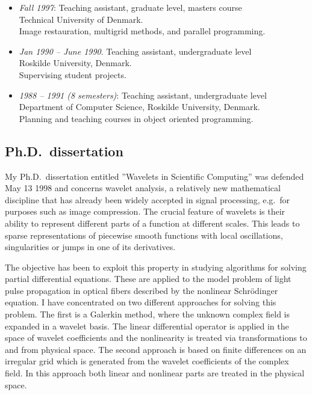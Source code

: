 \documentclass[12pt,a4paper]{article}
\begin{document}
\begin{itemize}
\item {\em Fall 1997}: Teaching assistant, graduate level, masters course\\ 
      Technical University of Denmark. \\
      Image restauration, multigrid methods, and parallel programming.

\item {\em Jan 1990 -- June 1990}. Teaching assistant, undergraduate level \\
      Roskilde University, Denmark. \\ 
      Supervising student projects. 

\item {\em 1988 -- 1991 (8 semesters)}: Teaching assistant, undergraduate level \\ 
      Department of Computer Science, Roskilde University, Denmark. \\
      Planning and teaching courses in object oriented programming. 
\end{itemize}

\newpage
\subsection*{Ph.D.\ dissertation}

My Ph.D.\ dissertation entitled ''Wavelets in Scientific Computing'' 
was defended May 13 1998 and concerns wavelet analysis, a
relatively new mathematical discipline that has already been widely accepted
in signal processing, e.g.\ for purposes such as image
compression. The crucial feature of wavelets is their ability to represent
different parts of a function at different scales. This leads to sparse
representations of piecewise smooth functions with local oscillations,
singularities or jumps in one of its derivatives.

The objective has been to exploit this property in studying algorithms for
solving partial differential equations. These are applied to the model
problem of light pulse propagation in optical fibers described by the
nonlinear Schr{\"o}dinger equation. I have concentrated on two different
approaches for solving this problem. The first is a Galerkin method, where
the unknown complex field is expanded in a wavelet basis. The linear
differential operator is applied in the space of wavelet coefficients and
the nonlinearity is treated via transformations to and from physical space.
The second approach is based on finite differences on an irregular grid
which is generated from the wavelet coefficients of the complex field. In
this approach both linear and nonlinear parts are treated in the physical
space.
\end{document}
